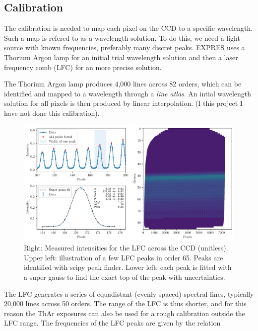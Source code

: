 \subsection{Calibration} 

    The calibration is needed to map each pixel on the CCD to a specific wavelength. Such a map is refered to as a wavelength solution. To do this, we need a light source with known frequencies, preferably many discret peaks. EXPRES uses a Thorium Argon lamp for an initial trial wavelength solution and then a laser frequency comb (LFC) for an more precise solution.
    
    The Thorium Argon lamp produces 4,000 lines across 82 orders, which can be identified and mapped to a wavelength through a \emph{line atlas}. An intial wavelength solution for all pixels is then produced by linear interpolation. (I this project I have not done this calibration).

    \begin{figure}[ht]
        \centering
        \includegraphics[scale=0.80]{figures/LFC_peak_fitting_overview.pdf}
        \caption{Right: Measured intensities for the LFC across the CCD (unitless). Upper left: illustration of a few LFC peaks in order 65. Peaks are identified with scipy peak finder. Lower left: each peak is fitted with a super gauss to find the exact top of the peak with uncertainties.}
        \label{fig:LFC_CCD}
    \end{figure}

    The LFC generates a series of equadistant (evenly spaced) spectral lines, typically 20,000 lines across 50 orders. The range of the LFC is thus shorter, and for this reason the ThAr exposures can also be used for a rough calibration outside the LFC range. The frequencies of the LFC peaks are given by the relation
    
